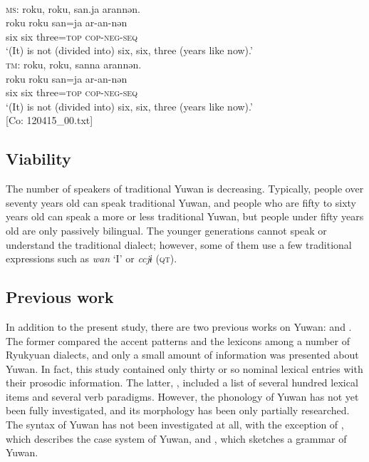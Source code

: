 \ea\label{ex:key:1}\\
\textsc{ms}: \glll {\textbar}roku, roku, san{\textbar}.ja arannən.\\
 roku roku san=ja ar-an-nən\\
 six six three=\textsc{top} \textsc{cop}-\textsc{neg}-\textsc{seq}\\
\glt{} ‘(It) is not (divided into) six, six, three (years like now).’\\
\textsc{tm}: \glll {\textbar}roku, roku, san{\textbar}na arannən.\\
 roku roku san=ja ar-an-nən\\
 six six three=\textsc{top} \textsc{cop}-\textsc{neg}-\textsc{seq}\\
\glt{} ‘(It) is not (divided into) six, six, three (years like now).’\\ [Co: 120415\_00.txt]
\z

\subsection{Viability}
\hypertarget{RefHeadingToc395696956}{}
The number of speakers of traditional Yuwan is decreasing. Typically, people over seventy years old can speak traditional Yuwan, and people who are fifty to sixty years old can speak a more or less traditional Yuwan, but people under fifty years old are only passively bilingual. The younger generations cannot speak or understand the traditional dialect; however, some of them use a few traditional expressions such as \textit{wan} ‘I’ or \textit{ccjɨ} (\textsc{qt}).

\subsection{Previous work}
\hypertarget{RefHeadingToc395696957}{}
In addition to the present study, there are two previous works on Yuwan: \citet{HirayamaEtAl1966} and \citet{UchimaEtAl1976}. The former compared the accent patterns and the lexicons among a number of Ryukyuan dialects, and only a small amount of information was presented about Yuwan. In fact, this study contained only thirty or so nominal lexical entries with their prosodic information. The latter, \citet{UchimaEtAl1976}, included a list of several hundred lexical items and several verb paradigms. However, the phonology of Yuwan has not yet been fully investigated, and its morphology has been only partially researched. The syntax of Yuwan has not been investigated at all, with the exception of \citet{Niinaga2008}, which describes the case system of Yuwan, and \citet{Niinaga2010}, which sketches a grammar of Yuwan.

